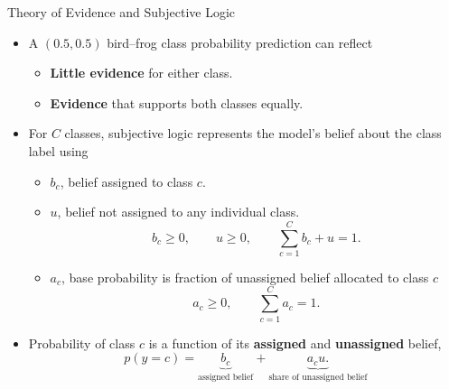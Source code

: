     
    \begin{frame}{Theory of Evidence and Subjective Logic}
    \label{frm:backup-subjective-logic}
    \begin{itemize}
    \setlength{\itemsep}{1mm}
    \item A $(0.5,0.5)$ bird--frog class probability prediction can reflect
    \begin{itemize}
    \item \textbf{Little evidence} for either class.
    \item \textbf{Evidence} that supports both classes equally.
    \end{itemize}
    \item For $C$ classes, subjective logic represents the model's belief about the class label using
    \begin{itemize}
    \item $b_c$, belief assigned to class $c$.
    \item $u$, belief not assigned to any individual class.
    \[
    b_c\geq0,\qquad u\geq0,\qquad \sum_{c=1}^{C}b_c+u=1.
    \]
    \item $a_c$, base probability is fraction of unassigned belief allocated to class $c$
    \[
    a_c\geq0,\qquad \sum_{c=1}^{C}a_c=1.
    \]
    \end{itemize}
    \item Probability of class $c$ is a function of its \textbf{assigned} and \textbf{unassigned} belief,
    \[
    p(y=c)=\underbrace{b_c}_{\text{assigned belief}}
    +\underbrace{a_cu.}_{\text{share of unassigned belief}}
    \]
    \end{itemize}
    \end{frame}
    
